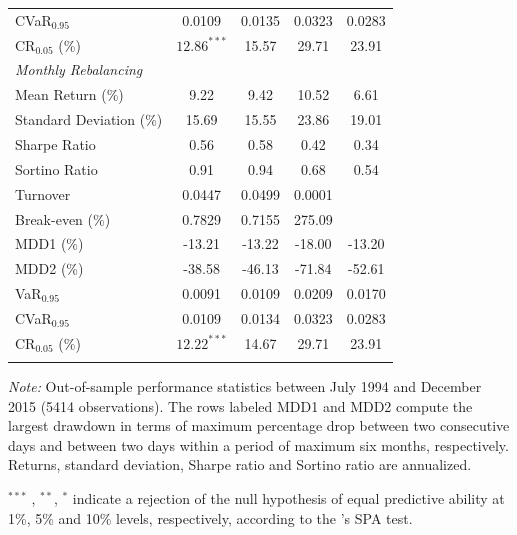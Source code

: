 \documentclass[a4paper,10pt]{article}
\begin{document}
\begin{threeparttable}[H]
\begin{tabularx}{\textwidth}{@{\extracolsep{\fill}}lcccc@{}}
		CVaR$_{0.95}$ & 0.0109 & 0.0135 & 0.0323 & 0.0283 \\
		CR$_{0.05}$ (\%) & $12.86^{***}$ & 15.57 & 29.71  & 23.91  \\
		\midrule[\heavyrulewidth] \textit{Monthly Rebalancing} &  &  &  &  \\
		\midrule[\heavyrulewidth] Mean Return (\%) & 9.22 & 9.42 & 10.52 & 6.61
		\\
		Standard Deviation (\%) & 15.69 & 15.55 & 23.86 & 19.01 \\
		Sharpe Ratio & 0.56 & 0.58 & 0.42 & 0.34 \\
		Sortino Ratio & 0.91 & 0.94 & 0.68 & 0.54 \\
		Turnover & 0.0447 & 0.0499 & 0.0001 &  \\
		Break-even (\%) &  0.7829 & 0.7155 & 275.09 &  \\
		MDD1 (\%) & -13.21 & -13.22 & -18.00 & -13.20 \\
		MDD2 (\%) & -38.58 & -46.13 & -71.84 & -52.61 \\
		VaR$_{0.95}$ &  0.0091 & 0.0109 & 0.0209  & 0.0170 \\
		CVaR$_{0.95}$ & 0.0109 & 0.0134 & 0.0323 & 0.0283 \\
		CR$_{0.05}$ (\%) & $12.22^{***}$ & 14.67 & 29.71  & 23.91  \\
		\bottomrule &  &  &  &
	\end{tabularx}%
\begin{tablenotes}
\item \textit{Note:} \scriptsize Out-of-sample performance statistics between July 1994 and December 2015 (5414 observations). The rows labeled MDD1 and MDD2 compute the largest drawdown in terms of maximum percentage drop between two consecutive days and between two days within a period of maximum six months, respectively. Returns, standard deviation, Sharpe ratio and Sortino ratio are annualized.
\item \scriptsize $^{\ast\ast\ast}$ , $^{\ast\ast}$, $^{\ast}$ indicate a rejection of the null hypothesis of equal predictive ability at 1\%, 5\% and 10\% levels, respectively, according to the \citet*{hansen2005test}'s SPA test.

\end{tablenotes}
\label{tab:table01}%
\end{threeparttable}

\vspace{0.3cm}
\end{document}
